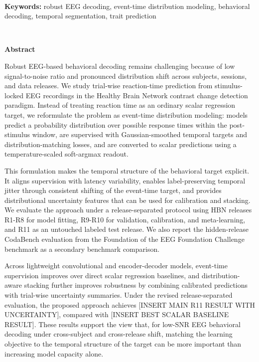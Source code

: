 \documentclass[12pt]{article}
\begin{document}
\ \\[-2mm]
{\bf Keywords:} robust EEG decoding, event-time distribution modeling, behavioral decoding, temporal segmentation, trait prediction

\thispagestyle{empty}
%
\ \vspace{-0mm}\\
%
\begin{center} {\bf Abstract} \end{center}

Robust EEG-based behavioral decoding remains challenging because of low signal-to-noise ratio and pronounced distribution shift across subjects, sessions, and data releases. We study trial-wise reaction-time prediction from stimulus-locked EEG recordings in the Healthy Brain Network contrast change detection paradigm. Instead of treating reaction time as an ordinary scalar regression target, we reformulate the problem as event-time distribution modeling: models predict a probability distribution over possible response times within the post-stimulus window, are supervised with Gaussian-smoothed temporal targets and distribution-matching losses, and are converted to scalar predictions using a temperature-scaled soft-argmax readout.

This formulation makes the temporal structure of the behavioral target explicit. It aligns supervision with latency variability, enables label-preserving temporal jitter through consistent shifting of the event-time target, and provides distributional uncertainty features that can be used for calibration and stacking. We evaluate the approach under a release-separated protocol using HBN releases R1-R8 for model fitting, R9-R10 for validation, calibration, and meta-learning, and R11 as an untouched labeled test release. We also report the hidden-release CodaBench evaluation from the Foundation of the EEG Foundation Challenge benchmark \citep{EEGFoundationChallengeArxiv2025} as a secondary benchmark comparison.

Across lightweight convolutional and encoder-decoder models, event-time supervision improves over direct scalar regression baselines, and distribution-aware stacking further improves robustness by combining calibrated predictions with trial-wise uncertainty summaries. Under the revised release-separated evaluation, the proposed approach achieves [INSERT MAIN R11 RESULT WITH UNCERTAINTY], compared with [INSERT BEST SCALAR BASELINE RESULT]. These results support the view that, for low-SNR EEG behavioral decoding under cross-subject and cross-release shift, matching the learning objective to the temporal structure of the target can be more important than increasing model capacity alone.
\end{document}
